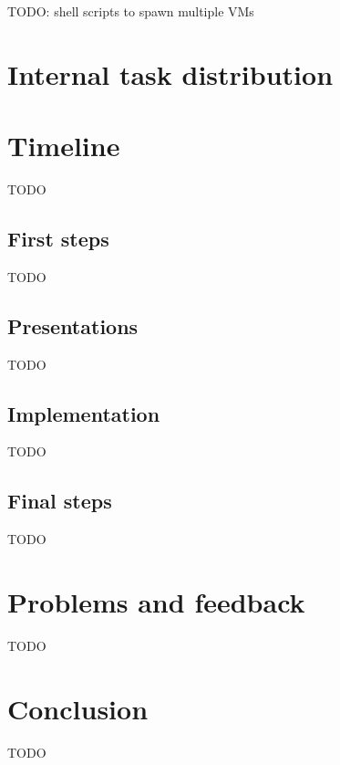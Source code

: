 \documentclass[DIV=calc, paper=a4, fontsize=11pt, twocolumn]{scrartcl}
\begin{document}
TODO: shell scripts to spawn multiple VMs


\section*{Internal task distribution}




\section*{Timeline}
TODO

\subsection*{First steps}
TODO

\subsection*{Presentations}
TODO

\subsection*{Implementation}
TODO

\subsection*{Final steps}
TODO


\section*{Problems and feedback}
TODO



\section*{Conclusion}
TODO




\end{document}
